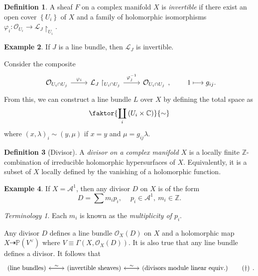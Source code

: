 \documentclass[10pt,letterpaper,cm]{nupset}
\theoremstyle{definition}
\newtheorem{defn}{Definition}[subsection]
\newtheorem{exmp}[defn]{Example}
\theoremstyle{theorem}
\theoremstyle{remark}
\newtheorem*{term}{Terminology}
\newcommand{\A}{\mathcal A}
\newcommand{\C}{\mathbb C}
\renewcommand{\L}{\mathcal L}
\renewcommand{\O}{\mathcal O}
\renewcommand{\P}{\mathbb P}
\newcommand{\Z}{\mathbb Z}
\newcommand{\1}{\mathbb{1}}
\newcommand{\0}{\vec 0}
\begin{document}
\begin{defn} 
A sheaf $F$ on a complex manifold $X$ is \textit{invertible} if there exist an open cover $\left\{U_i\right\}$ of $X$ and a family of holomorphic isomorphisms $\varphi_i : \O_{U_i} \to \L_J\restriction_{U_i}$.
\end{defn}

\begin{exmp} 
If $J$ is a line bundle, then $\L_J$ is invertible.
\end{exmp}

Consider the composite
\[
\begin{tikzcd}
\O_{U_i \cap U_j} \arrow[r, "\varphi_i"] & \L_J\restriction_{U_i \cap U_j} \arrow[r, "\varphi_j^{-1}"] & \O_{U_i \cap U_j}
\end{tikzcd}
, \ \quad \quad 1 \longmapsto g_{ij}.
\] From this, we can construct a line bundle $L$ over $X$ by defining the total space as 
\[
\faktor{\coprod_i\left(U_i \times \C\right)}{\sim}
\] where $\left(x, \lambda \right)_i \sim \left(y, \mu\right)$ if $x=y$ and $\mu = g_{ij}\lambda$. 

\medskip

\begin{defn}[Divisor]
A \textit{divisor on a complex manifold $X$} is a locally finite $\Z$-combination of irreducible holomorphic hypersurfaces of $X$. Equivalently, it is a subset of $X$ locally defined  by the vanishing of a holomorphic function.
\end{defn}

\begin{exmp}
If $X = \A^1$, then any divisor $D$ on $X$ is of the form $$D = \sum m_ip_i, \ \quad p_i \in \A^1, \ m_i \in \Z.$$ 
\end{exmp}

\begin{term}
Each $m_i$ is known as the \textit{multiplicity of $p_i$}.
\end{term}

Any divisor $D$ defines a line bundle $\O_X(D)$ on $X$ and a holomorphic map $X \dashrightarrow \P\left(V^{\vee}\right)$ where $V\equiv \Gamma\left(X, \O_X(D)\right)$. It is also true that any line bundle defines a divisor. It follows that
\[
\begin{tikzcd} 
\label{eqn:corr}
\left(\text{line bundles}\right) \arrow[r] & \left(\text{invertible sheaves}\right) \arrow[l, "\sim"'] \arrow[r] & \left(\text{divisors module linear equiv.}\right) \arrow[l, "\sim"'] \tag{$\dagger$}
\end{tikzcd}.
\]
\end{document}

